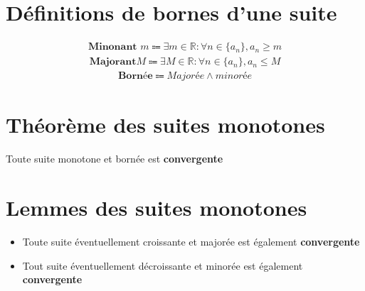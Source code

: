 \documentclass{report}
\begin{document}
\begin{multicols*}{3}
    \section{Définitions de bornes d'une suite}
       \begin{align*}
           \textbf{Minonant } m \Coloneqq 
           \exists m \in \mathbb{R} : \forall n \in \{ a_n \}, 
           a_n \geq m
       \end{align*}
       \begin{align*}
           \textbf{Majorant} M \Coloneqq 
           \exists M \in \mathbb{R} : \forall n \in \{ a_n \}, 
           a_n \leq M
       \end{align*}
       \begin{align*}
           \textbf{Bornée} \Coloneqq 
            \textit{Majorée} \land \textit{minorée}
       \end{align*}
       


    \section{Théorème des suites monotones}
        Toute suite monotone et bornée est \textbf{convergente}  


    \section{Lemmes des suites monotones}
        \begin{itemize}
            \item Toute suite éventuellement croissante et majorée 
        est également \textbf{convergente}  
            \item Tout suite éventuellement décroissante et 
            minorée est également \textbf{convergente}  
        \end{itemize}
    



\end{multicols*}
\end{document}
